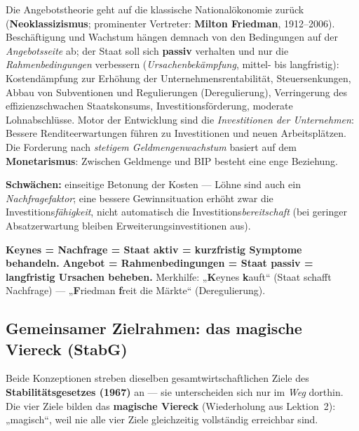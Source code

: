 \documentclass[11pt, a4paper]{article}
\begin{document}
Die Angebotstheorie geht auf die klassische Nationalökonomie zurück
(\textbf{Neoklassizismus}; prominenter Vertreter: \textbf{Milton Friedman}, 1912--2006).
Beschäftigung und Wachstum hängen demnach von den Bedingungen auf der
\emph{Angebotsseite} ab; der Staat soll sich \textbf{passiv} verhalten und nur die
\emph{Rahmenbedingungen} verbessern (\emph{Ursachenbekämpfung}, mittel- bis langfristig):
Kostendämpfung zur Erhöhung der Unternehmensrentabilität, Steuersenkungen, Abbau von
Subventionen und Regulierungen (Deregulierung), Verringerung des effizienzschwachen
Staatskonsums, Investitionsförderung, moderate Lohnabschlüsse. Motor der Entwicklung sind
die \emph{Investitionen der Unternehmen}: Bessere Renditeerwartungen führen zu
Investitionen und neuen Arbeitsplätzen. Die Forderung nach \emph{stetigem
Geldmengenwachstum} basiert auf dem \textbf{Monetarismus}: Zwischen Geldmenge und BIP
besteht eine enge Beziehung.

\textbf{Schwächen:} einseitige Betonung der Kosten --- Löhne sind auch ein
\emph{Nachfragefaktor}; eine bessere Gewinnsituation erhöht zwar die
Investitions\emph{fähigkeit}, nicht automatisch die Investitions\emph{bereitschaft} (bei
geringer Absatzerwartung bleiben Erweiterungsinvestitionen aus).

\begin{eselsbruecke}
\textbf{Keynes = Nachfrage = Staat aktiv = kurzfristig Symptome behandeln.}
\textbf{Angebot = Rahmenbedingungen = Staat passiv = langfristig Ursachen beheben.}
Merkhilfe: „\textbf{K}eynes \textbf{k}auft`` (Staat schafft Nachfrage) ---
„\textbf{F}riedman \textbf{f}reit die Märkte`` (Deregulierung).
\end{eselsbruecke}

\subsection{Gemeinsamer Zielrahmen: das magische Viereck (StabG)}

Beide Konzeptionen streben dieselben gesamtwirtschaftlichen Ziele des
\textbf{Stabilitätsgesetzes (1967)} an --- sie unterscheiden sich nur im \emph{Weg}
dorthin. Die vier Ziele bilden das \textbf{magische Viereck} (Wiederholung aus
Lektion~2): „magisch``, weil nie alle vier Ziele gleichzeitig vollständig erreichbar
sind.
\end{document}
